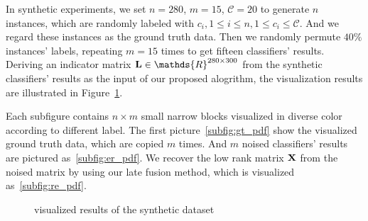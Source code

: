 \documentclass[letterpaper]{article}
\def\calC{{\mathcal{C}}}
\def\bL{{\bf L}}
\def\dsR{\mathds{R}}
\def\bX{{\bf X}}
\def\bX{{\bf X}}
\begin{document}
In synthetic experiments, we set $n = 280$, $m = 15$, $\calC = 20$ to generate $n$ instances, which are randomly labeled with $c_i, 1 \leq i \leq n, 1 \leq c_i \leq \calC$.
And we regard these instances as the ground truth data.
Then we randomly permute $40\%$ instances' labels, repeating $m = 15$ times to get fifteen classifiers' results.
Deriving an indicator matrix $\bL \in \dsR^{280 \times 300}$ from the synthetic classifiers' results as the input of our proposed alogrithm,
the visualization results are illustrated in Figure~\ref{fig:ensemble_cluster}.

Each subfigure contains $n\times m$ small narrow blocks visualized in diverse color according to different label.
The first picture~\ref{subfig:gt_pdf} show the visualized ground truth data, which are copied $m$ times.
And $m$ noised classifiers' results are pictured as~\ref{subfig:er_pdf}.
We recover the low rank matrix $\bX$ from the noised matrix by using our late fusion method, which is visualized as~\ref{subfig:re_pdf}.


\begin{figure}[htp]
\center
    \caption{visualized results of the synthetic dataset} \label{fig:ensemble_cluster}
\end{figure}
\end{document}
